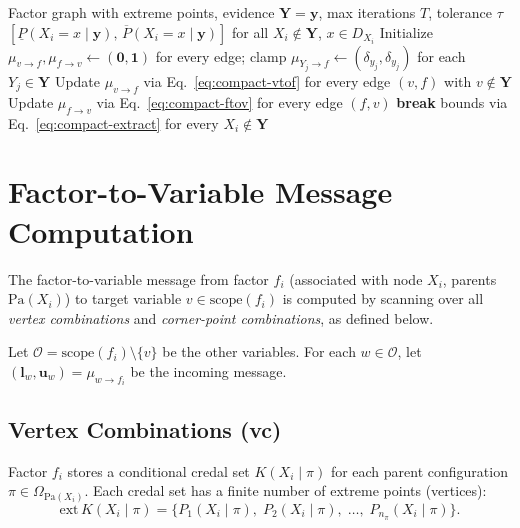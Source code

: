 \documentclass[11pt]{article}
\begin{document}
\begin{algorithm}[H]
\caption{Interval Belief Propagation --- Compact Form}
\label{alg:ibp-compact}
\begin{algorithmic}[1]
\Require Factor graph with extreme points, evidence $\mathbf{Y} = \mathbf{y}$,
         max iterations $T$, tolerance $\tau$
\Ensure $[\underline{P}(X_i{=}x \mid \mathbf{y}),\, \overline{P}(X_i{=}x \mid
        \mathbf{y})]$ for all $X_i \notin \mathbf{Y}$, $x \in D_{X_i}$
\State Initialize $\mu_{v \to f}, \mu_{f \to v} \gets (\mathbf{0}, \mathbf{1})$
       for every edge; clamp $\mu_{Y_j \to f} \gets (\delta_{y_j}, \delta_{y_j})$
       for each $Y_j \in \mathbf{Y}$
  \State Update $\mu_{v \to f}$ via Eq.~\ref{eq:compact-vtof} for every edge
         $(v, f)$ with $v \notin \mathbf{Y}$
  \State Update $\mu_{f \to v}$ via Eq.~\ref{eq:compact-ftov} for every edge
         $(f, v)$
   \textbf{break}
  \EndIf
\EndFor
\State \Return bounds via Eq.~\ref{eq:compact-extract} for every
       $X_i \notin \mathbf{Y}$
\end{algorithmic}
\end{algorithm}

\section{Factor-to-Variable Message Computation}\label{sec:ftov}

The factor-to-variable message from factor $f_i$ (associated with node $X_i$,
parents $\mathrm{Pa}(X_i)$) to target variable $v \in \mathrm{scope}(f_i)$
is computed by scanning over all \emph{vertex combinations} and
\emph{corner-point combinations}, as defined below.

Let $\mathcal{O} = \mathrm{scope}(f_i) \setminus \{v\}$ be the other variables.
For each $w \in \mathcal{O}$, let $(\mathbf{l}_{w}, \mathbf{u}_{w}) = \mu_{w \to f_i}$ be the incoming message.

\subsection{Vertex Combinations (vc)}\label{sec:vc}

Factor $f_i$ stores a conditional credal set $K(X_i \mid \pi)$ for each parent
configuration $\pi \in \Omega_{\mathrm{Pa}(X_i)}$. Each credal set has a finite
number of extreme points (vertices):
\[
  \mathrm{ext}\,K(X_i \mid \pi) = \{P_1(X_i \mid \pi),\; P_2(X_i \mid \pi),\; \dots,\; P_{n_\pi}(X_i \mid \pi)\}.
\]
\end{document}

